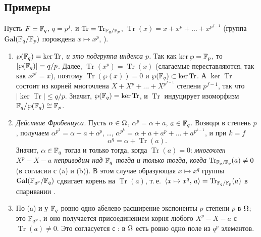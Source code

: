 \subsection*{Примеры}

\begin{example}
Пусть $F=\mathbb F_q$, $q=p^f$, и $\operatorname{Tr}=\operatorname{Tr}_{\mathbb F_q/\mathbb F_p}$, $\operatorname{Tr}(x)=x+x^p+\dots+x^{p^{f-1}}$ (группа
$\operatorname{Gal}(\mathbb F_q/\mathbb F_p)$ порождена $x\mapsto x^p$, ).
\begin{enumerate}[label=\textup{(\alph*)}]
\item \emph{$\wp(\mathbb F_q)=\ker\operatorname{Tr}$, и это подгруппа индекса $p$.} Так как $\ker\wp=\mathbb F_p$, то $|\wp(\mathbb F_q)|=q/p$.
Далее, $\operatorname{Tr}(x^p)=\operatorname{Tr}(x)$ (слагаемые переставляются, так как $x^{p^f}=x$), поэтому
$\operatorname{Tr}(\wp(x))=0$ и $\wp(\mathbb F_q)\subset\ker\operatorname{Tr}$. А $\ker\operatorname{Tr}$ состоит из корней многочлена
$X+X^p+\dots+X^{p^{f-1}}$ степени $p^{f-1}$, так что $|\ker\operatorname{Tr}|\le q/p$. Значит, $\wp(\mathbb F_q)=\ker\operatorname{Tr}$, и
$\operatorname{Tr}$ индуцирует изоморфизм $\mathbb F_q/\wp(\mathbb F_q)\cong\mathbb F_p$.
\item \emph{Действие Фробениуса.} Пусть $\alpha\in\Omega$, $\alpha^p=\alpha+a$, $a\in\mathbb F_q$. Возводя в степень $p$, получаем
$\alpha^{p^2}=\alpha+a+a^p$, \dots, $\alpha^{p^k}=\alpha+a+a^p+\dots+a^{p^{k-1}}$, и при $k=f$
\[
\alpha^q=\alpha+\operatorname{Tr}(a).
\]
Значит, $\alpha\in\mathbb F_q$ тогда и только тогда, когда $\operatorname{Tr}(a)=0$: \emph{многочлен $X^p-X-a$ неприводим над
$\mathbb F_q$ тогда и только тогда, когда $\operatorname{Tr}_{\mathbb F_q/\mathbb F_p}(a)\ne0$} (в согласии с (a) и (b)). В этом случае
образующая $x\mapsto x^q$ группы $\operatorname{Gal}(\mathbb F_{q^p}/\mathbb F_q)$ сдвигает корень на $\operatorname{Tr}(a)$, т.\,е.\
$\langle x\mapsto x^q,\,a\rangle=\operatorname{Tr}_{\mathbb F_q/\mathbb F_p}(a)$ в спаривании .
\item По (a) и \rf{5.32d} у $\mathbb F_q$ ровно одно абелево расширение экспоненты $p$ степени $p$ в $\Omega$; это $\mathbb F_{q^p}$, и оно
получается присоединением корня любого $X^p-X-a$ с $\operatorname{Tr}(a)\ne0$. Это согласуется с \rf{4.23}: в $\Omega$ есть ровно одно
поле из $q^p$ элементов.
\end{enumerate}
\end{example}

